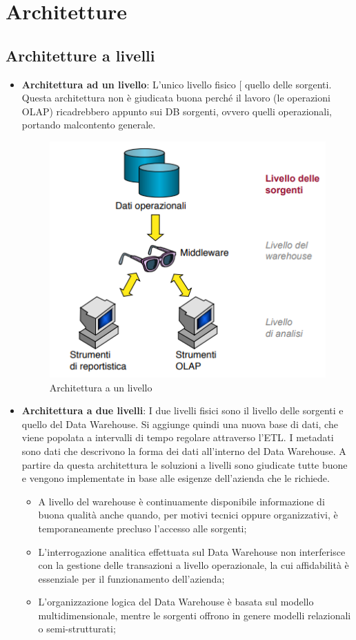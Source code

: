 \section{Architetture}
\subsection{Architetture a livelli}
\begin{itemize}
	\item \textbf{Architettura ad un livello}: L'unico livello fisico [ quello delle sorgenti. Questa architettura non è giudicata buona perché il lavoro (le operazioni OLAP) ricadrebbero appunto sui DB sorgenti, ovvero quelli operazionali, portando malcontento generale.
	\begin{figure}[H]
		\begin{center}
			\includegraphics[width=0.4\linewidth]{img/onelevel.PNG}
			\caption{Architettura a un livello}
		\end{center}
	\end{figure}
	\item \textbf{Architettura a due livelli}: I due livelli fisici sono il livello delle sorgenti e quello del Data Warehouse. Si aggiunge quindi una nuova base di dati, che viene popolata a intervalli di tempo regolare attraverso l'ETL. I metadati sono dati che descrivono la forma dei dati all'interno del Data Warehouse. A partire da questa architettura le soluzioni a livelli sono giudicate tutte buone e vengono implementate in base alle esigenze dell'azienda che le richiede.
	\begin{itemize}
		\item A livello del warehouse è continuamente disponibile informazione di buona qualità anche quando, per motivi tecnici oppure organizzativi, è temporaneamente precluso l’accesso alle sorgenti;
		\item L’interrogazione analitica effettuata sul Data Warehouse non interferisce con la gestione delle transazioni a livello operazionale, la cui affidabilità è essenziale per il funzionamento dell’azienda;
		\item L’organizzazione logica del Data Warehouse è basata sul modello multidimensionale, mentre le sorgenti offrono in genere modelli relazionali o semi-strutturati;

\end{itemize}
\end{itemize}
